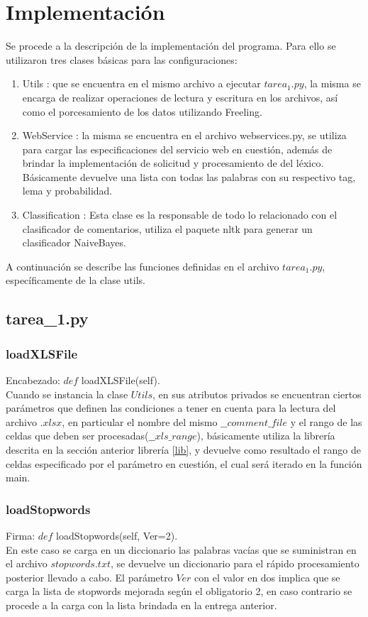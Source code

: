 \documentclass[12pt]{article}
\begin{document}
\section{Implementación} \label{impl}
Se procede a la descripción de la implementación del programa. Para ello se utilizaron tres clases básicas para las configuraciones:
\begin{enumerate}
   \item Utils : que se encuentra en el mismo archivo a ejecutar $tarea_1.py$, la misma se encarga de realizar operaciones de lectura y escritura en los archivos, así como el porcesamiento de los datos utilizando Freeling.
   \item WebService : la misma se encuentra en el archivo webservices.py, se utiliza para cargar las especificaciones del servicio web en cuestión, además de brindar la implementación de solicitud y procesamiento de del léxico. Básicamente devuelve una lista con todas las palabras con su respectivo tag, lema y probabilidad.
   \item Classification : Esta clase es la responsable de todo lo relacionado con el clasificador de comentarios, utiliza el paquete nltk para generar un clasificador NaiveBayes.
 \end{enumerate} 

A continuación se describe las funciones definidas en el archivo $tarea_1.py$, específicamente de la clase utils.


\subsection{tarea\_1.py}
\subsubsection{loadXLSFile} \label{xlslib}
Encabezado: $def$ loadXLSFile(self). \\
Cuando se instancia la clase $Utils$, en sus atributos privados se encuentran ciertos parámetros que definen las condiciones a tener en cuenta para la lectura del archivo $.xlsx$, en particular el nombre del mismo $\_\_comment\_file$ y el rango de las celdas que deben ser procesadas($\_\_xls\_range$), básicamente utiliza la librería descrita en la sección anterior librería \ref{lib}, y devuelve como resultado el rango de celdas especificado por el parámetro en cuestión, el cual será iterado en la función main.


\subsubsection{loadStopwords}\label{func:loadSW}
Firma: $def$ loadStopwords(self, Ver=2). \\
En este caso se carga en un diccionario las palabras vacías que se suministran en el archivo $stopwords.txt$, se devuelve un diccionario para el rápido procesamiento posterior llevado a cabo. El parámetro $Ver$ con el valor en dos implica que se carga la lista de stopwords mejorada según el obligatorio 2, en caso contrario se procede a la carga con la lista brindada en la entrega anterior.
\end{document}
